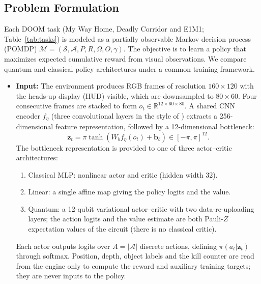 \documentclass[10pt, a4paper]{article}
\begin{document}
\subsection{Problem Formulation}

Each DOOM task (My Way Home, Deadly Corridor and E1M1; Table~\ref{tab:tasks}) is modeled as a partially
observable Markov decision process (POMDP)
$\mathcal{M}=(\mathcal{S},\mathcal{A},P,R,\Omega,O,\gamma)$.
The objective is to learn a policy that maximizes
expected cumulative reward from visual observations.
We compare quantum and classical policy architectures
under a common training framework.

\begin{itemize}
    \item \textbf{Input:}
    The environment produces RGB frames of resolution
    $160\times120$ with the heads-up display (HUD) visible, which are downsampled to $80\times60$.
    Four consecutive frames are stacked to form
    $o_t\in\mathbb{R}^{12\times60\times80}$.
    A shared CNN encoder $f_{\eta}$ (three convolutional layers in the style of \cite{mnih_dqn_2015}) extracts a
    256-dimensional feature representation, followed
    by a 12-dimensional bottleneck:
    \begin{equation}
        \mathbf{z}_t =
        \pi\tanh(W_b f_{\eta}(o_t)+\mathbf{b}_b)
        \in[-\pi,\pi]^{12}.
    \end{equation}
    The bottleneck representation is provided to one
    of three actor--critic architectures:
    \begin{enumerate}
        \item Classical MLP: nonlinear actor and critic (hidden width 32).
        \item Linear: a single affine map giving the policy logits and the value.
        \item Quantum: a 12-qubit variational actor--critic
        with two data-re-uploading layers; the action logits and the value
        estimate are both Pauli-$Z$ expectation values of the circuit (there is no classical critic).
    \end{enumerate}
    Each actor outputs logits over
    $A=|\mathcal{A}|$ discrete actions, defining
    $\pi(a_t|\mathbf{z}_t)$ through softmax.
    Position, depth, object labels and the kill counter are read from the engine only to compute
    the reward and auxiliary training targets; they are never inputs to the policy.


\end{itemize}
\end{document}
